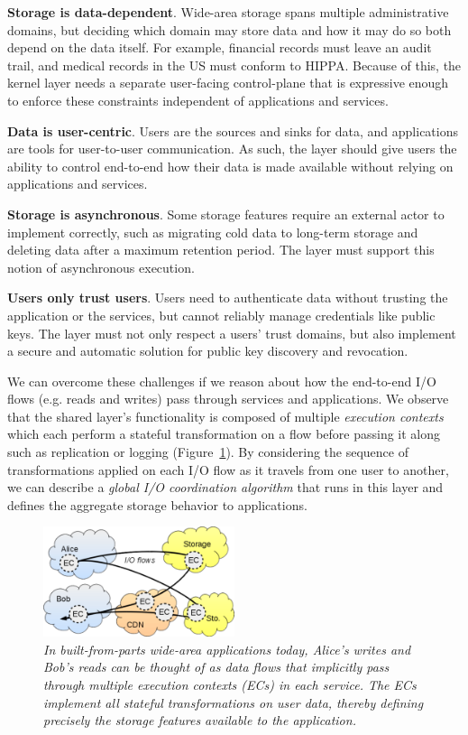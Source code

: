 \textbf{Storage is data-dependent}. Wide-area storage spans multiple
administrative domains, but deciding which domain may store data and how it may
do so both depend on the data itself. For example, financial records must leave
an audit trail, and medical records in the US must conform to HIPPA. Because of
this, the kernel layer needs a separate user-facing control-plane that is
expressive enough to enforce these constraints independent of applications and
services.

\textbf{Data is user-centric}. Users are the sources and sinks for data, and
applications are tools for user-to-user communication. As such, the layer should
give users the ability to control end-to-end how their data is made available
without relying on applications and services.

\textbf{Storage is asynchronous}. Some storage features require an external
actor to implement correctly, such as migrating cold data to long-term storage
and deleting data after a maximum retention period. The layer must support this
notion of asynchronous execution.

\textbf{Users only trust users}. Users need to authenticate data without
trusting the application or the services, but cannot reliably manage credentials
like public keys. The layer must not only respect a users' trust domains, but
also implement a secure and automatic solution for public key discovery and
revocation.

We can overcome these challenges if we reason about how the end-to-end I/O flows
(e.g. reads and writes) pass through services and applications.  We observe that
the shared layer's functionality is composed of multiple \textit{execution contexts}
which each perform a stateful transformation on a flow before passing it along
such as replication or logging (Figure~\ref{fig:execution-contexts}).  By
considering the sequence of transformations applied on each I/O flow as it
travels from one user to another, we can describe a \textit{global I/O
coordination algorithm} that runs in this layer and defines the aggregate
storage behavior to applications.

\begin{figure}[t!]
\centering
\includegraphics[width=0.5\textwidth]{figures/execution-contexts}
\caption{\it In built-from-parts wide-area applications today, Alice's writes
and Bob's reads can be thought of as data flows that implicitly pass through
multiple execution contexts (ECs) in each service.  The ECs
implement all stateful transformations on user data, thereby defining
precisely the storage features available to the application.}
\label{fig:execution-contexts}
\end{figure}


